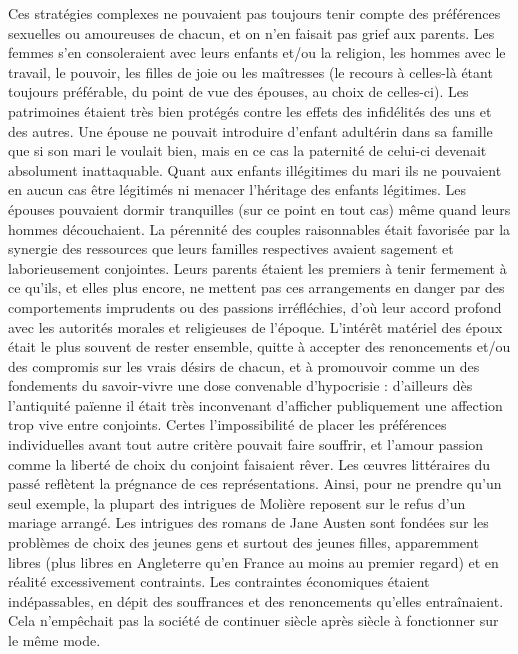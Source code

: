  Ces stratégies complexes ne pouvaient pas toujours tenir compte des préférences sexuelles ou amoureuses de chacun, et on n'en faisait pas grief aux parents. Les femmes s'en consoleraient avec leurs enfants et/ou la religion, les hommes avec le travail, le pouvoir, les filles de joie ou les maîtresses (le recours à celles-là étant toujours préférable, du point de vue des épouses, au choix de celles-ci). Les patrimoines étaient très bien protégés contre les effets des infidélités des uns et des autres. Une épouse ne pouvait introduire d'enfant adultérin dans sa famille que si son mari le voulait bien, mais en ce cas la paternité de celui-ci devenait absolument inattaquable. Quant aux enfants illégitimes du mari ils ne pouvaient en aucun cas être légitimés ni menacer l'héritage des enfants légitimes. Les épouses pouvaient dormir tranquilles (sur ce point en tout cas) même quand leurs hommes découchaient. 
 La pérennité des couples raisonnables était favorisée par la synergie des ressources que leurs familles respectives avaient sagement et laborieusement conjointes. Leurs parents étaient les premiers à tenir fermement à ce qu'ils, et elles plus encore, ne mettent pas ces arrangements en danger par des comportements imprudents ou des passions irréfléchies, d'où leur accord profond avec les autorités morales et religieuses de l'époque. L'intérêt matériel des époux était le plus souvent de rester ensemble, quitte à accepter des renoncements et/ou des compromis sur les vrais désirs de chacun, et à promouvoir comme un des fondements du savoir-vivre une dose convenable d'hypocrisie : d'ailleurs dès l'antiquité païenne il était très inconvenant d'afficher publiquement une affection trop vive entre conjoints. 
 Certes l'impossibilité de placer les préférences individuelles avant tout autre critère pouvait faire souffrir, et l'amour passion comme la liberté de choix du conjoint faisaient rêver. Les œuvres littéraires du passé reflètent la prégnance de ces représentations. Ainsi, pour ne prendre qu'un seul exemple, la plupart des intrigues de Molière reposent sur le refus d'un mariage arrangé. Les intrigues des romans de Jane Austen sont fondées sur les problèmes de choix des jeunes gens et surtout des jeunes filles, apparemment libres (plus libres en Angleterre qu'en France au moins au premier regard) et en réalité excessivement contraints. Les contraintes économiques étaient indépassables, en dépit des souffrances et des renoncements qu'elles entraînaient. Cela n'empêchait pas la société de continuer siècle après siècle à fonctionner sur le même mode. 
